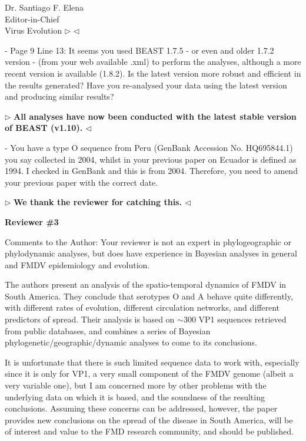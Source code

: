 \documentclass[12pt, a4paper]{letter} %
\newenvironment{reply}{$\triangleright$\bf}{$\triangleleft$}
\begin{document}
\begin{letter}{
	Dr. Santiago F. Elena\\
    Editor-in-Chief \\
    Virus Evolution
}
\begin{reply}
\end{reply}

-       Page 9 Line 13: It seems you used BEAST 1.7.5 - or even and older 1.7.2 version - (from your web available .xml) to perform the analyses, although a more recent version is available (1.8.2). 
Is the latest version more robust and efficient in the results generated? 
Have you re-analysed your data using the latest version and producing similar results?

\begin{reply}
All analyses have now been conducted with the latest stable version of BEAST (v1.10). 
\end{reply}

-       You have a type O sequence from Peru (GenBank Accession No. HQ695844.1) you say collected in 2004, whilst in your previous paper on Ecuador is defined as 1994. 
I checked in GenBank and this is from 2004. 
Therefore, you need to amend your previous paper with the correct date.

\begin{reply}
We thank the reviewer for catching this.
\end{reply}

\textbf{Reviewer \#3}

Comments to the Author: Your reviewer is not an expert in phylogeographic or phylodynamic analyses, but does have experience in Bayesian analyses in general and FMDV epidemiology and evolution.

The authors present an analysis of the spatio-temporal dynamics of FMDV in South America. 
They conclude that serotypes O and A behave quite differently, with different rates of evolution, different circulation networks, and different predictors of spread. 
Their analysis is based on $\sim$300 VP1 sequences retrieved from public databases, and combines a series of Bayesian phylogenetic/geographic/dynamic analyses to come to its conclusions.

It is unfortunate that there is such limited sequence data to work with, especially since it is only for VP1, a very small component of the FMDV genome (albeit a very variable one), but I am concerned more by other problems with the underlying data on which it is based, and the soundness of the resulting conclusions. 
Assuming these concerns can be addressed, however, the paper provides new conclusions on the spread of the disease in South America, will be of interest and value to the FMD research community, and should be published.


\end{letter}
\end{document}
